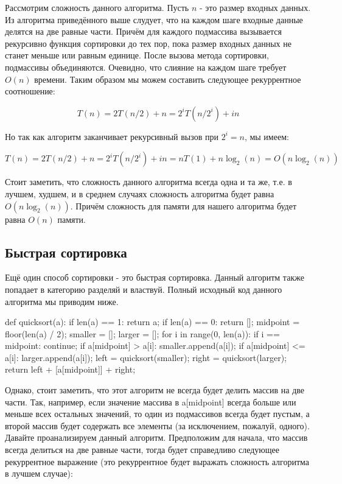Рассмотрим сложность данного алгоритма. Пусть $n$ - это размер входных 
данных. Из алгоритма приведённого выше слудует, что на каждом шаге 
входные данные делятся на две равные части. Причём для каждого подмассива
вызывается рекурсивно функция сортировки до тех пор, пока размер входных
данных не станет меньше или равным единице. После вызова метода сортировки, подмассивы 
объединяются. Очевидно, что слияние на каждом шаге требует $O(n)$ времени.
Таким образом мы можем составить следующее рекуррентное соотношение:

$$T(n) = 2T(n/2) + n = 2^iT(n/2^i)+in$$

Но так как алгоритм заканчивает рекурсивный вызов при $2^i=n$, мы имеем:

$$T(n) = 2T(n/2) + n = 2^iT(n/2^i)+in = nT(1)+n\log_2(n) = O(n\log_2(n))$$

Стоит заметить, что сложность данного алгоритма всегда одна и та же, т.е. 
в лучшем, худшем, и в среднем случаях сложность алгоритма будет равна
$O(n\log_2(n))$. Причём сложность для памяти для нашего алгоритма будет 
равна $O(n)$ памяти.

\subsection{Быстрая сортировка}

Ещё один способ сортировки - это быстрая сортировка. Данный алгоритм также попадает 
в категорию разделяй и властвуй. Полный исходный код данного алгоритма мы приводим 
ниже. 

\begin{python}
def quicksort(a):
	if len(a) == 1:
		return a;
	if len(a) == 0:
		return [];
	midpoint = floor(len(a) / 2);
	smaller = [];
	larger  = [];
	for i in range(0, len(a)):
		if i == midpoint:
			continue;
		if a[midpoint] > a[i]:
			smaller.append(a[i]);
		if a[midpoint] <= a[i]:
			larger.append(a[i]);
	left = quicksort(smaller);
	right = quicksort(larger);
	return left + [a[midpoint]] + right;
\end{python}

Однако, стоит заметить, что этот алгоритм не всегда будет делить массив на две части.
Так, например, если значение массива в a[midpoint] всегда больше или меньше всех остальных 
значений, то один из подмассивов всегда будет пустым, а второй массив будет содержать все 
элементы (за исключением, пожалуй, одного). Давайте проанализируем данный алгоритм. 
Предположим для начала, что массив всегда делиться на две равные части, тогда будет 
справедливо следующее рекуррентное выражение (это рекуррентное будет выражать 
сложность алгоритма в лучшем случае):

